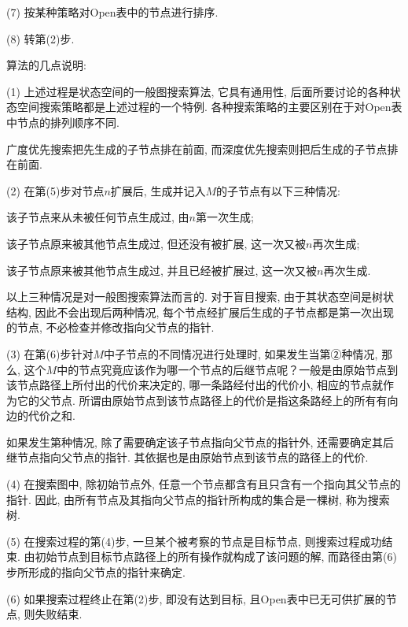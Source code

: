 (7) 按某种策略对Open表中的节点进行排序.

(8) 转第(2)步.
\begin{remark}
算法的几点说明:

(1) 上述过程是状态空间的一般图搜索算法, 它具有通用性, 后面所要讨论的各种状态空间搜索策略都是上述过程的一个特例. 各种搜索策略的主要区别在于对Open表中节点的排列顺序不同.
\begin{example}
  广度优先搜索把先生成的子节点排在前面, 而深度优先搜索则把后生成的子节点排在前面.
\end{example}

(2) 在第(5)步对节点$n$扩展后, 生成并记入$M$的子节点有以下三种情况:

    \quad {} 该子节点来从未被任何节点生成过, 由$n$第一次生成;

    \quad {} 该子节点原来被其他节点生成过, 但还没有被扩展, 这一次又被$n$再次生成;

    \quad {} 该子节点原来被其他节点生成过, 并且已经被扩展过, 这一次又被$n$再次生成.

以上三种情况是对一般图搜索算法而言的. 对于盲目搜索, 由于其状态空间是树状结构, 因此不会出现后两种情况, 每个节点经扩展后生成的子节点都是第一次出现的节点, 不必检查并修改指向父节点的指针.

(3) 在第(6)步针对$M$中子节点的不同情况进行处理时, 如果发生当第②种情况, 那么, 这个$M$中的节点究竟应该作为哪一个节点的后继节点呢？一般是由原始节点到该节点路径上所付出的代价来决定的, 哪一条路经付出的代价小, 相应的节点就作为它的父节点. 所谓由原始节点到该节点路径上的代价是指这条路经上的所有有向边的代价之和.

如果发生第种情况, 除了需要确定该子节点指向父节点的指针外, 还需要确定其后继节点指向父节点的指针. 其依据也是由原始节点到该节点的路径上的代价.

(4) 在搜索图中, 除初始节点外, 任意一个节点都含有且只含有一个指向其父节点的指针. 因此, 由所有节点及其指向父节点的指针所构成的集合是一棵树, 称为搜索树.

(5) 在搜索过程的第(4)步, 一旦某个被考察的节点是目标节点, 则搜索过程成功结束. 由初始节点到目标节点路径上的所有操作就构成了该问题的解, 而路径由第(6)步所形成的指向父节点的指针来确定.

(6) 如果搜索过程终止在第(2)步, 即没有达到目标, 且\textup{Open}表中已无可供扩展的节点, 则失败结束.
\end{remark}
